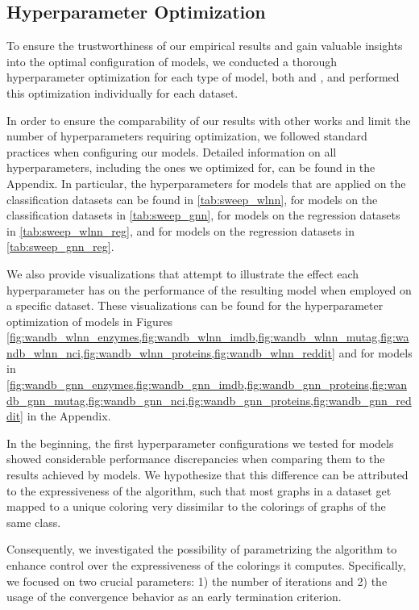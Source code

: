\subsection{Hyperparameter Optimization}\label{sec:hyperparam}
To ensure the trustworthiness of our empirical results and gain valuable insights into the optimal configuration of \wlnn models, we conducted a thorough hyperparameter optimization for each type of model, both \gnn and \wlnn, and performed this optimization individually for each dataset.

In order to ensure the comparability of our results with other works and limit the number of hyperparameters requiring optimization, we followed standard practices when configuring our models. Detailed information on all hyperparameters, including the ones we optimized for, can be found in the Appendix. In particular, the hyperparameters for \wlnn models that are applied on the classification datasets can be found in \cref{tab:sweep_wlnn}, for \gnn models on the classification datasets in \cref{tab:sweep_gnn}, for \wlnn models on the regression datasets in \cref{tab:sweep_wlnn_reg}, and for \gnn models on the regression datasets in \cref{tab:sweep_gnn_reg}. 

We also provide visualizations that attempt to illustrate the effect each hyperparameter has on the performance of the resulting model when employed on a specific dataset. These visualizations can be found for the hyperparameter optimization of \wlnn models in Figures \cref{fig:wandb_wlnn_enzymes,fig:wandb_wlnn_imdb,fig:wandb_wlnn_mutag,fig:wandb_wlnn_nci,fig:wandb_wlnn_proteins,fig:wandb_wlnn_reddit} and for \gnn models in \cref{fig:wandb_gnn_enzymes,fig:wandb_gnn_imdb,fig:wandb_gnn_proteins,fig:wandb_gnn_mutag,fig:wandb_gnn_nci,fig:wandb_gnn_proteins,fig:wandb_gnn_reddit} in the Appendix.

In the beginning, the first hyperparameter configurations we tested for \wlnn models showed considerable performance discrepancies when comparing them to the results achieved by \gnn models. We hypothesize that this difference can be attributed to the expressiveness of the \wl algorithm, such that most graphs in a dataset get mapped to a unique coloring very dissimilar to the colorings of graphs of the same class.

Consequently, we investigated the possibility of parametrizing the \wl algorithm to enhance control over the expressiveness of the colorings it computes. Specifically, we focused on two crucial parameters: 1) the number of iterations and 2) the usage of the convergence behavior as an early termination criterion.


